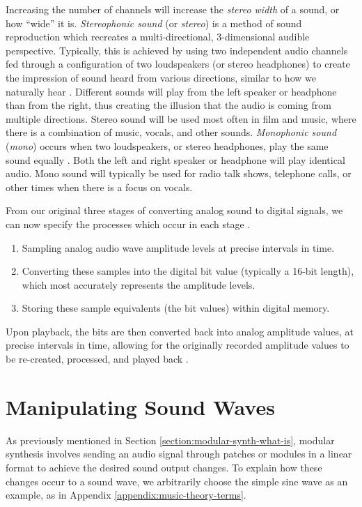 Increasing the number of channels will increase the \textit{stereo width} of a sound, or how ``wide'' it is. \textit{Stereophonic sound} (or \textit{stereo}) is a method of sound reproduction which recreates a multi-directional, 3-dimensional audible perspective. Typically, this is achieved by using two independent audio channels fed through a configuration of two loudspeakers (or stereo headphones) to create the impression of sound heard from various directions, similar to how we naturally hear \cite{Au-Yeung_2021}. Different sounds will play from the left speaker or headphone than from the right, thus creating the illusion that the audio is coming from multiple directions. Stereo sound will be used most often in film and music, where there is a combination of music, vocals, and other sounds. \textit{Monophonic sound} (\textit{mono}) occurs when two loudspeakers, or stereo headphones, play the same sound equally \cite{Au-Yeung_2021}. Both the left and right speaker or headphone will play identical audio. Mono sound will typically be used for radio talk shows, telephone calls, or other times when there is a focus on vocals.

From our original three stages of converting analog sound to digital signals, we can now specify the processes which occur in each stage \cite{Huber_Runstein_2018}. 

\begin{enumerate}
	\item Sampling analog audio wave amplitude levels at precise intervals in time.
	\item Converting these samples into the digital bit value (typically a 16-bit length), which most accurately represents the amplitude levels.
	\item Storing these sample equivalents (the bit values) within digital memory.
\end{enumerate}

Upon playback, the bits are then converted back into analog amplitude values, at precise intervals in time, allowing for the originally recorded amplitude values to be re-created, processed, and played back \cite{Huber_Runstein_2018}. 

\section{Manipulating Sound Waves}\label{section:manip-waves}
As previously mentioned in Section \ref{section:modular-synth-what-is}, modular synthesis involves sending an audio signal through patches or modules in a linear format to achieve the desired sound output changes. To explain how these changes occur to a sound wave, we arbitrarily choose the simple sine wave as an example, as in Appendix \ref{appendix:music-theory-terms}. 

